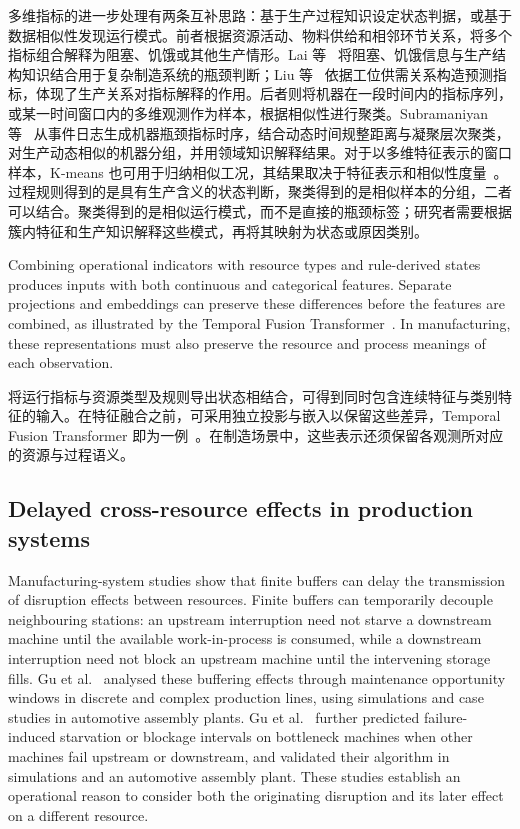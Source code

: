 \documentclass[a4paper,fleqn]{cas-dc}
\newcommand{\zhpara}[1]{%
  \par\begingroup\small\color{black!72}\noindent #1\par\endgroup}
\begin{document}
\zhpara{多维指标的进一步处理有两条互补思路：基于生产过程知识设定状态判据，或基于数据相似性发现运行模式。前者根据资源活动、物料供给和相邻环节关系，将多个指标组合解释为阻塞、饥饿或其他生产情形。Lai 等~\cite{lai2021data} 将阻塞、饥饿信息与生产结构知识结合用于复杂制造系统的瓶颈判断；Liu 等~\cite{liu2023lstmdam} 依据工位供需关系构造预测指标，体现了生产关系对指标解释的作用。后者则将机器在一段时间内的指标序列，或某一时间窗口内的多维观测作为样本，根据相似性进行聚类。Subramaniyan 等~\cite{subramaniyan2020clustering} 从事件日志生成机器瓶颈指标时序，结合动态时间规整距离与凝聚层次聚类，对生产动态相似的机器分组，并用领域知识解释结果。对于以多维特征表示的窗口样本，K-means 也可用于归纳相似工况，其结果取决于特征表示和相似性度量~\cite{jain2010clustering}。过程规则得到的是具有生产含义的状态判断，聚类得到的是相似样本的分组，二者可以结合。聚类得到的是相似运行模式，而不是直接的瓶颈标签；研究者需要根据簇内特征和生产知识解释这些模式，再将其映射为状态或原因类别。}


Combining operational indicators with resource types and rule-derived states produces inputs with both continuous and categorical features. Separate projections and embeddings can preserve these differences before the features are combined, as illustrated by the Temporal Fusion Transformer~\cite{lim2021tft}. In manufacturing, these representations must also preserve the resource and process meanings of each observation.

\zhpara{将运行指标与资源类型及规则导出状态相结合，可得到同时包含连续特征与类别特征的输入。在特征融合之前，可采用独立投影与嵌入以保留这些差异，Temporal Fusion Transformer 即为一例~\cite{lim2021tft}。在制造场景中，这些表示还须保留各观测所对应的资源与过程语义。}


\subsection{Delayed cross-resource effects in production systems}\label{sec:manufacturing-delay}

Manufacturing-system studies show that finite buffers can delay the transmission of disruption effects between resources. Finite buffers can temporarily decouple neighbouring stations: an upstream interruption need not starve a downstream machine until the available work-in-process is consumed, while a downstream interruption need not block an upstream machine until the intervening storage fills. Gu et al.~\cite{gu2013hidden} analysed these buffering effects through maintenance opportunity windows in discrete and complex production lines, using simulations and case studies in automotive assembly plants. Gu et al.~\cite{gu2015passive} further predicted failure-induced starvation or blockage intervals on bottleneck machines when other machines fail upstream or downstream, and validated their algorithm in simulations and an automotive assembly plant. These studies establish an operational reason to consider both the originating disruption and its later effect on a different resource.
\end{document}
